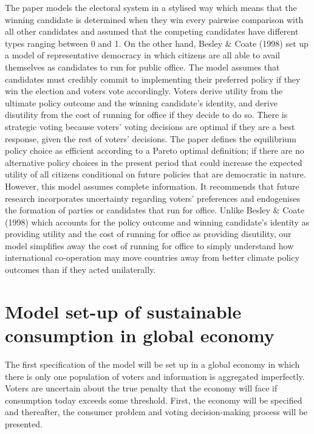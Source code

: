\documentclass[11pt,preprint, authoryear]{elsarticle}
\numberwithin{equation}{section}
\numberwithin{figure}{section}
\numberwithin{table}{section}
\begin{document}
The paper models the electoral system in a stylised way which means that
the winning candidate is determined when they win every pairwise
comparison with all other candidates and assumed that the competing
candidates have different types ranging between 0 and 1. On the other
hand, Besley \& Coate (1998) set up a model of representative democracy
in which citizens are all able to avail themselves as candidates to run
for public office. The model assumes that candidates must credibly
commit to implementing their preferred policy if they win the election
and voters vote accordingly. Voters derive utility from the ultimate
policy outcome and the winning candidate's identity, and derive
disutility from the cost of running for office if they decide to do so.
There is strategic voting because voters' voting decisions are optimal
if they are a best response, given the rest of voters' decisions. The
paper defines the equilibrium policy choice as efficient according to a
Pareto optimal definition; if there are no alternative policy choices in
the present period that could increase the expected utility of all
citizens conditional on future policies that are democratic in nature.
However, this model assumes complete information. It recommends that
future research incorporates uncertainty regarding voters' preferences
and endogenises the formation of parties or candidates that run for
office. Unlike Besley \& Coate (1998) which accounts for the policy
outcome and winning candidate's identity as providing utility and the
cost of running for office as providing disutility, our model simplifies
away the cost of running for office to simply understand how
international co-operation may move countries away from better climate
policy outcomes than if they acted unilaterally.

\hypertarget{model-set-up-of-sustainable-consumption-in-global-economy}{%
\section{Model set-up of sustainable consumption in global
economy}\label{model-set-up-of-sustainable-consumption-in-global-economy}}

The first specification of the model will be set up in a global economy
in which there is only one population of voters and information is
aggregated imperfectly. Voters are uncertain about the true penalty that
the economy will face if consumption today exceeds some threshold.
First, the economy will be specified and thereafter, the consumer
problem and voting decision-making process will be presented.
\end{document}
